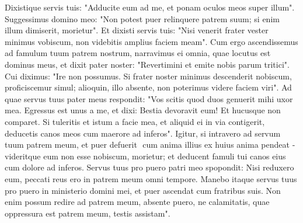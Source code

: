 \begin{biblechapter}
\verse Dixistique servis tuis: "Adducite eum ad me, et ponam oculos meos super illum". 
\verse Suggessimus domino meo: "Non potest puer relinquere patrem suum; si enim illum dimiserit, morietur". 
\verse Et dixisti servis tuis: "Nisi venerit frater vester minimus vobiscum, non videbitis amplius faciem meam". 
\verse Cum ergo ascendissemus ad famulum tuum patrem nostrum, narravimus ei omnia, quae locutus est dominus meus, 
\verse et dixit pater noster: "Revertimini et emite nobis parum tritici". 
\verse Cui diximus: "Ire non possumus. Si frater noster minimus descenderit nobiscum, proficiscemur simul; alioquin, illo absente, non poterimus videre faciem viri". 
\verse Ad quae servus tuus pater meus respondit: "Vos scitis quod duos genuerit mihi uxor mea. 
\verse Egressus est unus a me, et dixi: Bestia devoravit eum! Et hucusque non comparet. 
\verse Si tuleritis et istum a facie mea, et aliquid ei in via contigerit, deducetis canos meos cum maerore ad inferos". 
\verse Igitur, si intravero ad servum tuum patrem meum, et puer defuerit ­ cum anima illius ex huius anima pendeat ­ 
\verse videritque eum non esse nobiscum, morietur; et deducent famuli tui canos eius cum dolore ad inferos. 
\verse Servus tuus pro puero patri meo spopondit: Nisi reduxero eum, peccati reus ero in patrem meum omni tempore. 
\verse Manebo itaque servus tuus pro puero in ministerio domini mei, et puer ascendat cum fratribus suis. 
\verse Non enim possum redire ad patrem meum, absente puero, ne calamitatis, quae oppressura est patrem meum, testis assistam". 
\end{biblechapter}

